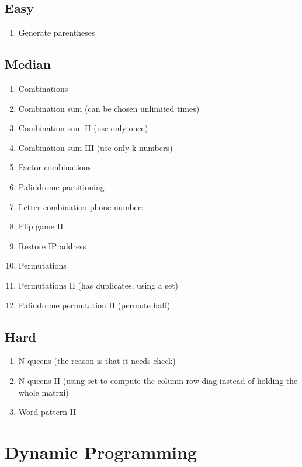 \documentclass[DIV=calc, paper=a4, fontsize=11pt, twocolumn]{scrartcl}	 %
\begin{document}
\subsection*{Easy}
\begin{enumerate}
\item Generate parentheses
\end{enumerate}

\subsection*{Median}
\begin{enumerate}
\item Combinations \cite{077}
\item Combination sum (can be chosen unlimited times) \cite{039}
\item Combination sum II (use only once) \cite{040}
\item Combination sum III (use only k numbers) \cite{216}
\item Factor combinations \cite{254}
\item Palindrome partitioning \cite{131}
\item Letter combination phone number: \cite{017} 
\item {\color{red} Flip game II} \cite{293} 
\item Restore IP address \cite{093}
\item Permutations \cite{046} 
\item Permutations II (has duplicates, using a set)
\item Palindrome permutation II (permute half)
\end{enumerate}

\subsection*{Hard}
\begin{enumerate}
\item N-queens (the reason is that it needs check)
\item N-queens II (using set to compute the column row diag instead of holding the whole matrxi)
\item Word pattern II
\end{enumerate}


\section*{Dynamic Programming}
\end{document}
